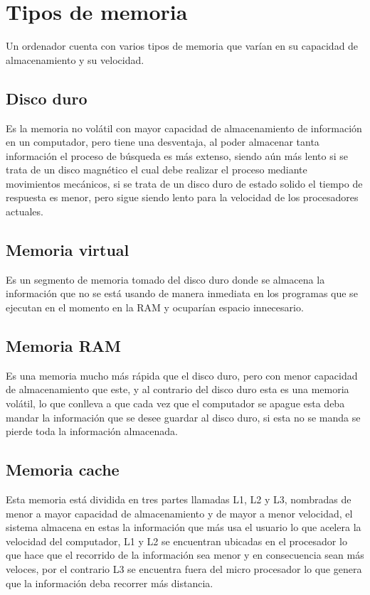 \documentclass{article}
\begin{document}
\section{Tipos de memoria} \label{contenido}


Un ordenador cuenta con varios tipos de memoria que varían en su capacidad de almacenamiento
y su velocidad. 


\subsection{Disco duro }

Es la memoria no volátil con mayor capacidad de almacenamiento de información en un computador, pero tiene una desventaja, al poder almacenar tanta información el proceso de búsqueda es más extenso, siendo aún más lento si se trata de un disco magnético el cual debe realizar el proceso mediante movimientos mecánicos, si se trata de un disco duro de estado solido el tiempo de respuesta es menor, pero sigue siendo lento para la velocidad de los procesadores actuales. 

\subsection{Memoria virtual }

Es un segmento de memoria tomado del disco duro donde se almacena la información que no se está usando de manera inmediata en los programas que se ejecutan en el momento en la RAM y ocuparían espacio innecesario. 

\subsection{Memoria RAM }

Es una memoria mucho más rápida que el disco duro, pero con menor capacidad de almacenamiento que este, y al contrario del disco duro esta es una memoria volátil, lo que conlleva a que cada vez que el computador se apague esta deba mandar la información que se desee guardar al disco duro, si esta no se manda se pierde toda la información almacenada.   

\subsection{Memoria cache }

Esta memoria está dividida en tres partes llamadas L1, L2 y L3, nombradas de menor a mayor capacidad de almacenamiento y de mayor a menor velocidad, el sistema almacena en estas la información que más usa el usuario lo que acelera la velocidad del computador, L1 y L2 se encuentran ubicadas en el procesador lo que hace que el recorrido de la información sea menor  y en consecuencia sean más veloces, por el contrario L3 se encuentra fuera del micro procesador lo que genera que la información deba recorrer más distancia. 
\end{document}
